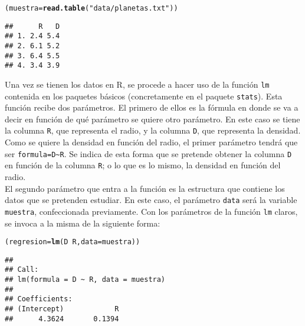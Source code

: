 \documentclass[12pt]{report}\usepackage[]{graphicx}\usepackage[dvipsnames]{xcolor}
\makeatletter
\newcommand{\hlstr}[1]{\textcolor[rgb]{0.192,0.494,0.8}{#1}}%
\newcommand{\hlopt}[1]{\textcolor[rgb]{0,0,0}{#1}}%
\newcommand{\hlstd}[1]{\textcolor[rgb]{0.345,0.345,0.345}{#1}}%
\newcommand{\hlkwb}[1]{\textcolor[rgb]{0.69,0.353,0.396}{#1}}%
\newcommand{\hlkwc}[1]{\textcolor[rgb]{0.333,0.667,0.333}{#1}}%
\newcommand{\hlkwd}[1]{\textcolor[rgb]{0.737,0.353,0.396}{\textbf{#1}}}%
\newenvironment{kframe}{%
 \def\at@end@of@kframe{}%
 \ifinner\ifhmode%
  \def\at@end@of@kframe{\end{minipage}}%
  \begin{minipage}{\columnwidth}%
 \fi\fi%
 \def\FrameCommand##1{\hskip\@totalleftmargin \hskip-\fboxsep
 \colorbox{shadecolor}{##1}\hskip-\fboxsep
     \hskip-\linewidth \hskip-\@totalleftmargin \hskip\columnwidth}%
 \MakeFramed {\advance\hsize-\width
   \@totalleftmargin\z@ \linewidth\hsize
   \@setminipage}}%
 {\par\unskip\endMakeFramed%
 \at@end@of@kframe}
\newenvironment{knitrout}{}{} %
\makeatother
\begin{document}
\begin{knitrout}
\color{fgcolor}\begin{kframe}
\begin{alltt}
\hlstd{(muestra} \hlkwb{=} \hlkwd{read.table}\hlstd{(}\hlstr{"data/planetas.txt"}\hlstd{))}
\end{alltt}
\begin{verbatim}
##      R   D
## 1. 2.4 5.4
## 2. 6.1 5.2
## 3. 6.4 5.5
## 4. 3.4 3.9
\end{verbatim}
\end{kframe}
\end{knitrout}
			
			Una vez se tienen los datos en R, se procede a hacer uso de la función \texttt{lm} contenida en los paquetes básicos (concretamente en el paquete \texttt{stats}). Esta función recibe dos parámetros. El primero de ellos es la fórmula en donde se va a decir en función de qué parámetro se quiere otro parámetro. En este caso se tiene la columna \texttt{R}, que representa el radio, y la columna \texttt{D}, que representa la densidad. Como se quiere la densidad en función del radio, el primer parámetro tendrá que ser \texttt{formula=D\~{}R}. Se indica de esta forma que se pretende obtener la columna \texttt{D} en función de la columna \texttt{R}; o lo que es lo mismo, la densidad en función del radio.\\ 
			
			El segundo parámetro que entra a la función es la estructura que contiene los datos que se pretenden estudiar. En este caso, el parámetro \texttt{data} será la variable \texttt{muestra}, confeccionada previamente. Con los parámetros de la función \texttt{lm} claros, se invoca a la misma de la siguiente forma:
			
\begin{knitrout}
\color{fgcolor}\begin{kframe}
\begin{alltt}
\hlstd{(regresion}\hlkwb{=}\hlkwd{lm}\hlstd{(D}\hlopt{~}\hlstd{R,} \hlkwc{data}\hlstd{=muestra))}
\end{alltt}
\begin{verbatim}
## 
## Call:
## lm(formula = D ~ R, data = muestra)
## 
## Coefficients:
## (Intercept)            R  
##      4.3624       0.1394
\end{verbatim}
\end{kframe}
\end{knitrout}
			
\end{document}
